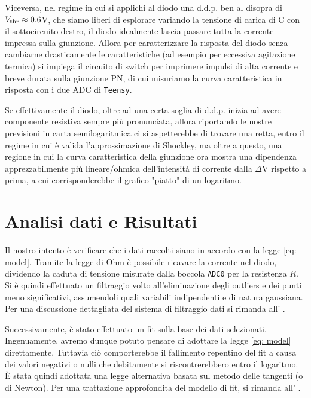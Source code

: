\documentclass{article}[a4paper, oneside, 11pt]
\begin{document}
Viceversa, nel regime in cui si applichi al diodo una d.d.p. ben al disopra di
$V_{\rm thr} \approx 0.6 $V, che siamo liberi di esplorare variando la tensione
di carica di C con il sottocircuito destro, il diodo idealmente lascia passare
tutta la corrente impressa sulla giunzione. Allora per caratterizzare la
risposta del diodo senza cambiarne drasticamente le caratteristiche (ad esempio
per eccessiva agitazione termica) si impiega il circuito di switch per
imprimere impulsi di alta corrente e breve durata sulla giunzione PN, di cui
misuriamo la curva caratteristica in risposta con i due ADC di \verb+Teensy+.

Se effettivamente il diodo, oltre ad una certa soglia di d.d.p. inizia ad avere
componente resistiva sempre più pronunciata, allora riportando le nostre
previsioni in carta semilogaritmica ci si aspetterebbe di trovare una retta,
entro il regime in cui è valida l'approssimazione di Shockley, ma oltre a
questo, una regione in cui la curva caratteristica della giunzione ora mostra
una dipendenza apprezzabilmente più lineare/ohmica dell'intensità di corrente
dalla $\Delta$V rispetto a prima, a cui corrisponderebbe il grafico "piatto"
di un logaritmo.  

\section{Analisi dati e Risultati}
Il nostro intento è verificare che i dati raccolti siano in accordo con la
legge \eqref{eq: model}. Tramite la legge di Ohm è possibile ricavare la
corrente nel diodo, dividendo la caduta di tensione misurate dalla boccola
\verb'ADC0' per la resistenza $R$. Si è quindi effettuato un filtraggio volto
all'eliminazione degli outliers e dei punti meno significativi, assumendoli
quali variabili indipendenti e di natura gaussiana. Per una discussione
dettagliata del sistema di filtraggio dati si rimanda all' .

Successivamente, è stato effettuato un fit sulla base dei dati selezionati.
Ingenuamente, avremo dunque potuto pensare di adottare la legge 
\eqref{eq: model} direttamente. Tuttavia ciò comporterebbe il fallimento
repentino del fit a causa dei valori negativi o nulli che debitamente si
riscontrerebbero entro il logaritmo. \`E stata quindi adottata una legge
alternativa basata sul metodo delle tangenti (o di Newton). Per una
trattazione approfondita del modello di fit, si rimanda all' .
\end{document}
